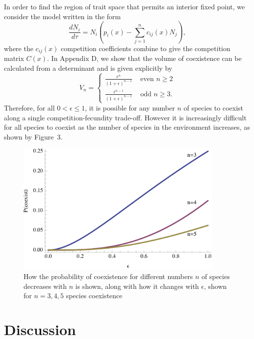 In order to find the region of trait space that permits an interior fixed point, we consider the model written in the form
\begin{equation}
\frac{dN_i}{d\tau}=N_i\left(p_i(x) - \sum_{j=1}^n c_{ij}(x)N_j\right),
\end{equation}
where the $c_{ij}(x)$ competition coefficients combine to give the competition matrix $C(x)$. In Appendix D, we show that the volume of coexistence can be calculated from a determinant and is given explicitly by
\[
V_{n}=
\left\{
\begin{array}{rl}
\frac{\epsilon^{n}}{(1+\epsilon)^{n-1}} & \mbox{ even }n\geq 2\\
\frac{\epsilon^{n-1}}{(1+\epsilon)^{n-1}} & \mbox{ odd }n\geq 3. 
\end{array} \right.
\]
Therefore, for all $0<\epsilon \leq1$, it is possible for any number $n$ of species to coexist along a single competition-fecundity trade-off. However it is increasingly difficult for all species to coexist as the number of species in the environment increases, as shown by Figure~3.

\begin{figure}[htbp]
   \centering
   \includegraphics[width=4in]{Figure3}
   \caption{How the probability of coexistence for different numbers $n$ of species decreases with $n$ is shown, along with how it changes with $\epsilon$, shown for $n=3,4,5$ species coexistence}
   \label{fig:ndif}
\end{figure}


\section{Discussion}

